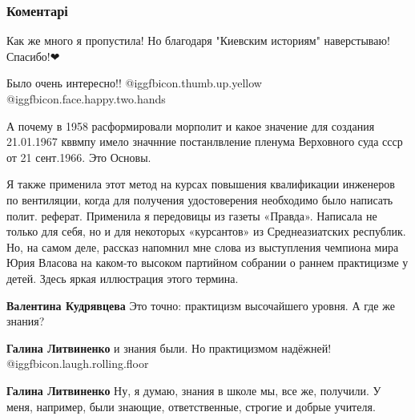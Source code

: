  
 
 
 
 
\subsubsection{Коментарі}
\label{sec:09_11_2021.fb.fb_group.story_kiev_ua.1.rasskaz_sssr_kiev.cmt}

\begin{itemize} %

Как же много я пропустила! Но благодаря "Киевским историям" наверстываю! Спасибо!❤

Было очень интересно!! @igg{fbicon.thumb.up.yellow}   @igg{fbicon.face.happy.two.hands} 


А почему в 1958 расформировали морполит и какое значение для создания
21.01.1967 кввмпу имело значнние постанлвление пленума Верховного суда ссср от
21 сент.1966. Это Основы.


Я также применила этот метод на курсах повышения квалификации инженеров по
вентиляции, когда для получения удостоверения необходимо было написать полит.
реферат. Применила я передовицы из газеты «Правда». Написала не только для
себя, но и для некоторых «курсантов» из Среднеазиатских республик. Но, на самом
деле, рассказ напомнил мне слова из выступления чемпиона мира Юрия Власова на
каком-то высоком партийном собрании о раннем практицизме у детей. Здесь яркая
иллюстрация этого термина.

\begin{itemize} %
\textbf{Валентина Кудрявцева} Это точно: практицизм высочайшего уровня. А где же знания?

\begin{itemize} %

\textbf{Галина Литвиненко} и знания были. Но практицизмом надёжней! @igg{fbicon.laugh.rolling.floor} 

\textbf{Галина Литвиненко} Ну, я думаю, знания в школе мы, все же, получили. У меня, например, были знающие, ответственные, строгие и добрые учителя.


\end{itemize}
\end{itemize}
\end{itemize}
